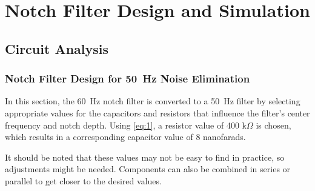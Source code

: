 \documentclass[hidelinks,12pt]{article}
\begin{document}
	\pagebreak
	
	\section{Notch Filter Design and Simulation}
	\subsection{Circuit Analysis}
    \subsubsection{Notch Filter Design for 50~Hz Noise Elimination}
	In this section, the 60~Hz notch filter is converted to a 50~Hz filter by selecting appropriate values for the capacitors and resistors that influence the filter's center frequency and notch depth. Using \cref{eq:1}, a resistor value of 400 k$\Omega$ is chosen, which results in a corresponding capacitor value of 8 nanofarads.
	
	It should be noted that these values may not be easy to find in practice, so adjustments might be needed. Components can also be combined in series or parallel to get closer to the desired values.
	
\end{document}

